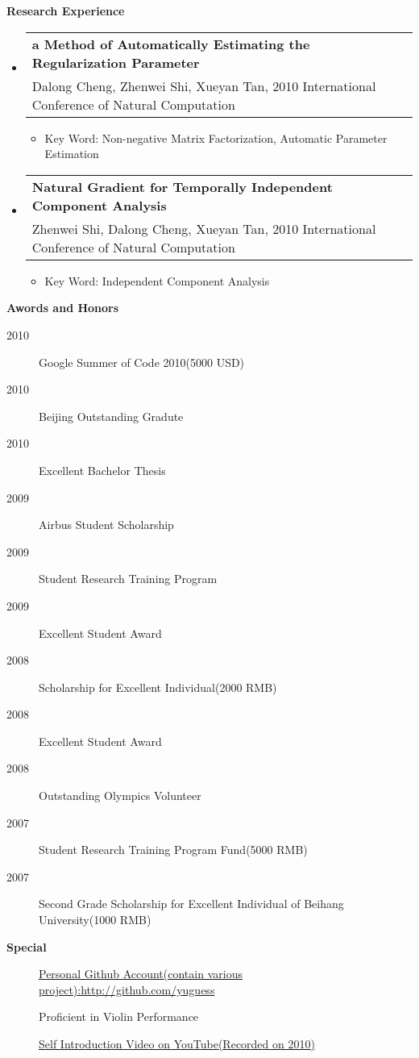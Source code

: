 \documentclass[letterpaper,11pt]{article}
\makeatletter
\newcommand{\resitem}[1]{\item #1 \vspace{-2pt}}
\newcommand{\resheading}[1]{{\large \colorbox{mygrey}{\begin{minipage}{\textwidth}{\textbf{#1 \vphantom{p\^{E}}}}\end{minipage}}}}
\newcommand{\ressubheading}[4]{
\begin{tabular*}{6.5in}{l@{\extracolsep{\fill}}r}
		\textbf{#1} & #2 \\
		{#3}{} & \textit{#4} \\
\end{tabular*}\vspace{-6pt}}
\makeatother
\begin{document}
\resheading{Research Experience}
	\begin{itemize}
		\item
			\ressubheading{a Method of Automatically Estimating the Regularization Parameter
}{}{Dalong Cheng, Zhenwei Shi, Xueyan Tan, 2010 International Conference of Natural Computation}{}
				{ \footnotesize
				\begin{itemize}
					\resitem{Key Word: Non-negative Matrix Factorization, Automatic Parameter Estimation}
				\end{itemize}
          		}
		\item 
			\ressubheading{Natural Gradient for Temporally Independent Component Analysis}{}{Zhenwei Shi, Dalong Cheng, Xueyan Tan, 2010 International Conference of Natural Computation}{}
				{ \footnotesize
				\begin{itemize}
					\resitem{Key Word: Independent Component Analysis}
				\end{itemize}
				}

	\end{itemize}  %

\resheading{{Awords and Honors}}
	\begin{description}
        \item[2010] {Google Summer of Code 2010(5000 USD)}
        \item[2010] {Beijing Outstanding Gradute}
	    \item[2010] {Excellent Bachelor Thesis}
        \item[2009] {Airbus Student Scholarship}
        \item[2009] {Student Research Training Program}
        \item[2009] {Excellent Student Award}
        \item[2008] {Scholarship for Excellent Individual(2000 RMB)}
        \item[2008] {Excellent Student Award}
        \item[2008] {Outstanding Olympics Volunteer}
        \item[2007] {Student Research Training Program Fund(5000 RMB)}
        \item[2007] {Second Grade Scholarship for Excellent Individual of Beihang University(1000 RMB)}
	
	\end{description}
    
\resheading{{Special}}
	\begin{description}
        \item[] {\href{http://github.com/yuguess}{Personal Github Account(contain various project):http://github.com/yuguess}}
        \item[] {Proficient in Violin Performance}
        \item[] {\href{http://www.youtube.com/watch?v=zGBpT7A_nYM}{Self Introduction Video on YouTube(Recorded on 2010)}}
	
	\end{description}
\end{document}
